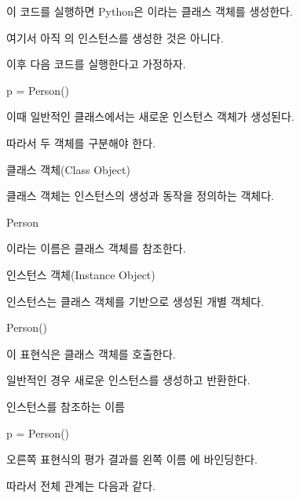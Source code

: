 이 코드를 실행하면 Python은 이라는 클래스 객체를 생성한다.

여기서 아직 의 인스턴스를 생성한 것은 아니다.

이후 다음 코드를 실행한다고 가정하자.

\begin{dhkcode}
p = Person()
\end{dhkcode}

이때 일반적인 클래스에서는 새로운 인스턴스 객체가 생성된다.

따라서 두 객체를 구분해야 한다.

\begin{dhknote}
\begin{dhksmry}[centered]
클래스 객체(Class Object)
\end{dhksmry}
\end{dhknote}

클래스 객체는 인스턴스의 생성과 동작을 정의하는 객체다.

\begin{dhkcode}
Person
\end{dhkcode}

이라는 이름은 클래스 객체를 참조한다.

\begin{dhknote}
\begin{dhksmry}[centered]
인스턴스 객체(Instance Object)
\end{dhksmry}
\end{dhknote}

인스턴스는 클래스 객체를 기반으로 생성된 개별 객체다.

\begin{dhkcode}
Person()
\end{dhkcode}

이 표현식은 클래스 객체를 호출한다.

일반적인 경우 새로운 인스턴스를 생성하고 반환한다.

\begin{dhknote}
\begin{dhksmry}[centered]
인스턴스를 참조하는 이름
\end{dhksmry}
\end{dhknote}

\begin{dhkcode}
p = Person()
\end{dhkcode}

오른쪽 표현식의 평가 결과를 왼쪽 이름 에 바인딩한다.

따라서 전체 관계는 다음과 같다.

